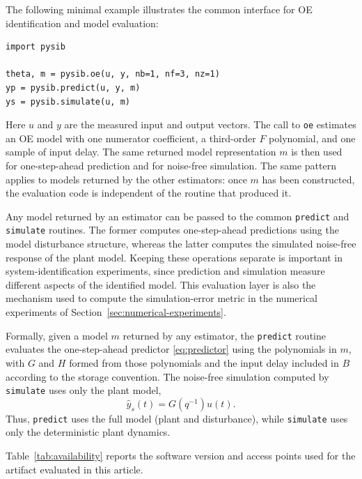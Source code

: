 \documentclass{ifacconf}
\begin{document}
The following minimal example illustrates the common interface for OE
identification and model evaluation:
{\footnotesize\begin{verbatim}
import pysib

theta, m = pysib.oe(u, y, nb=1, nf=3, nz=1)
yp = pysib.predict(u, y, m)
ys = pysib.simulate(u, m)
\end{verbatim}}
Here \(u\) and \(y\) are the measured input and output vectors.  The call to
\texttt{oe} estimates an OE model with one numerator coefficient, a third-order
\(F\) polynomial, and one sample of input delay.  The same returned model
representation \(m\) is then used for one-step-ahead prediction and for
noise-free simulation.  The same pattern applies to models returned by the other
estimators: once \(m\) has been constructed, the evaluation code is independent
of the routine that produced it.

Any model returned by an estimator can be passed to the common \texttt{predict}
and \texttt{simulate} routines.  The former computes one-step-ahead predictions
using the model disturbance structure, whereas the latter computes the simulated
noise-free response of the plant model.  Keeping these operations separate is
important in system-identification experiments, since prediction and simulation
measure different aspects of the identified model.  This evaluation layer is
also the mechanism used to compute the simulation-error metric in the numerical
experiments of Section~\ref{sec:numerical-experiments}.

Formally, given a model \(m\) returned by any estimator, the \texttt{predict}
routine evaluates the one-step-ahead predictor \eqref{eq:predictor} using the
polynomials in \(m\), with \(G\) and \(H\) formed from those polynomials and the
input delay included in \(B\) according to the storage convention.  The
noise-free simulation computed by \texttt{simulate} uses only the plant model,
\begin{equation}
  \hat y_s(t) = G(q^{-1})u(t).
  \label{eq:simulate-routine}
\end{equation}
Thus, \texttt{predict} uses the full model (plant and disturbance), while
\texttt{simulate} uses only the deterministic plant dynamics.

Table~\ref{tab:availability} reports the software version and access points used
for the artifact evaluated in this article.
\end{document}
